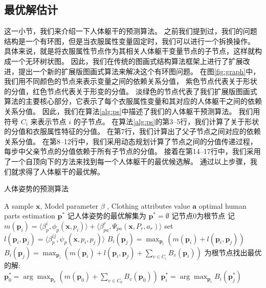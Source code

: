 \subsection{最优解估计}
这一小节，我们来介绍一下人体躯干的预测算法。
之前我们提到过，我们的问题结构是一个有环图，但是当衣服属性变量固定时，我们可以进行一个拆换操作。
具体来说，就是将衣服属性节点作为其相关人体躯干变量节点的子节点，这样就构成一个无环树状图。
因此，我们在传统的图画式结构算法框架上进行了扩展改进，提出一个新的扩展版图画式算法来解决这个有环图问题。
在图\ref{fig:graph}中，我们用不同颜色的节点来表示变量之间的依赖关系分值，
紫色节点代表关于形状的分值，红色节点代表关于形变的分值。
淡绿色的节点代表了我们扩展版图画式算法的主要核心部分，它表示了每个衣服属性变量和其对应的人体躯干之间的依赖关系分值。
因此，我们在算法\ref{alg:ps}中描述了我们的人体躯干预测算法。
我们用符号 $C_i$ 来表示节点 $i$ 的子节点。
在算法\ref{alg:ps}的第3--5行，我们计算了关于形状的分值和衣服属性特征的分值。
在第7行，我们计算出了父子节点之间对应的依赖关系分值。
在第8--12行中，我们采用动态规划计算了节点之间的分值传递过程，每步中父亲节点的分值依赖于所有子节点的分值。
接着在第14--17行中，我们采用了一个自顶向下的方法来找到每一个人体躯干的最优候选解。
通过以上步骤，我们就求得了人体躯干的最优解。

\begin{algorithm}
\caption{人体姿势的预测算法}
\begin{algorithmic}[1]
    \REQUIRE A sample $\mathbf{x}$, Model parameter $\beta$ ,  Clothing attributes value $\mathbf{a}$
    \ENSURE optimal human parts estimation $\mathbf{p^*}$
    \STATE 记人体姿势的最优解集为 $\mathbf{p^*} = \emptyset$
    \STATE 记节点0为根节点
        \STATE 记 $m(\mathbf{p}_i) = \langle \beta_p^i, \phi_p(\mathbf{x}, p_i) \rangle + \langle \beta_{pa}^r, \Psi_{pa}(\mathbf{x}, P_r, a_r) \rangle$
    \ENDFOR
        \STATE set $l(\mathbf{p}_i, \mathbf{p}_j) = \langle \beta_p^{ij}, \psi_p(\mathbf{x}, p_i, p_j) \rangle$
            \STATE $B_i(\mathbf{p}_j) = \max_{\mathbf{p}_i} (m(\mathbf{p}_i) + l(\mathbf{p}_i, \mathbf{p}_j) )$
        \ELSE
            \STATE $B_i(\mathbf{p}_j) = \max_{\mathbf{p}_i} (m(\mathbf{p}_i) + l(\mathbf{p}_i, \mathbf{p}_j) + \sum_{v \in C_i} B_v(\mathbf{p}_i) )$
        \ENDIF
    \ENDFOR
    \STATE 为根节点找出最优的解: \\
        $\mathbf{p}_0^* = \arg \max_{\mathbf{p}_0} ( m(\mathbf{p}_0) + \sum_{v \in C_0} B_v(\mathbf{p}_0) )$
        \STATE $\mathbf{p}_i^* = \arg \max_{\mathbf{p}_i} B_i(\mathbf{p}_j^*)$
    \ENDFOR
\end{algorithmic}
\label{alg:ps}
\end{algorithm}
